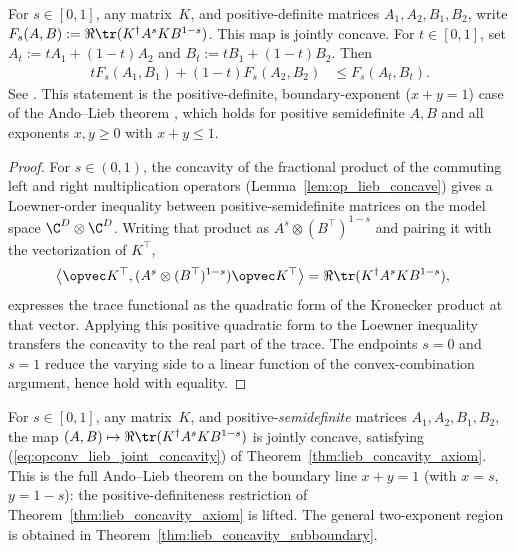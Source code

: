 \begin{theorem}\label{thm:lieb_concavity_axiom}
    \leanok
    For $s\in[0,1]$, any matrix~$K$, and positive-definite matrices
    $A_1,A_2,B_1,B_2$, write
    $F_s(A,B):=\Re\tr(K^\dagger A^s K B^{1-s})$. This map is jointly
    concave. For $t\in[0,1]$, set
    $A_t:=tA_1+(1-t)A_2$ and $B_t:=tB_1+(1-t)B_2$. Then
    \begin{align}
        tF_s(A_1,B_1)+(1-t)F_s(A_2,B_2)
        &\le F_s(A_t,B_t).
        \label{eq:opconv_lieb_joint_concavity}
    \end{align}
    See \cite{Lieb1973Convex,Ando1979Concavity}.
    This statement is the positive-definite, boundary-exponent ($x+y=1$) case of
    the Ando--Lieb theorem \cite[Theorem~5.15]{Wolf2012Quantum}, which holds for
    positive semidefinite $A,B$ and all exponents $x,y\ge0$ with $x+y\le1$.
\end{theorem}

\begin{proof}\leanok
    For $s\in(0,1)$, the concavity of the fractional product of the commuting
    left and right multiplication operators (Lemma~\ref{lem:op_lieb_concave})
    gives a Loewner-order inequality between positive-semidefinite matrices on
    the model space $\C^D\otimes\C^D$. Writing that product as
    $A^s\otimes(B^\top)^{1-s}$ and pairing it with the vectorization of $K^\top$,
    \begin{align}
        \left\langle
            \opvec K^\top,
            (A^s\otimes(B^\top)^{1-s})\opvec K^\top
        \right\rangle
        &= \Re\tr(K^\dagger A^s K B^{1-s}),
        \notag
    \end{align}
    expresses the trace functional as the quadratic form of the Kronecker
    product at that vector. Applying this positive quadratic form to the
    Loewner inequality transfers the concavity to the real part of the trace.
    The endpoints $s=0$ and $s=1$ reduce the varying side to a linear function
    of the convex-combination argument, hence hold with equality.
\end{proof}

\begin{theorem}
    \label{thm:lieb_concavity_psd}
    \leanok
    For $s\in[0,1]$, any matrix~$K$, and positive-\emph{semidefinite} matrices
    $A_1,A_2,B_1,B_2$, the map
    $(A,B)\mapsto\Re\tr(K^\dagger A^s K B^{1-s})$
    is jointly concave, satisfying
    (\ref{eq:opconv_lieb_joint_concavity}) of
    Theorem~\ref{thm:lieb_concavity_axiom}.
    This is the full Ando--Lieb theorem
    \cite[Theorem~5.15]{Wolf2012Quantum} on the boundary line $x+y=1$
    (with $x=s$, $y=1-s$): the positive-definiteness restriction of
    Theorem~\ref{thm:lieb_concavity_axiom} is lifted. The general
    two-exponent region is obtained in
    Theorem~\ref{thm:lieb_concavity_subboundary}.
\end{theorem}


